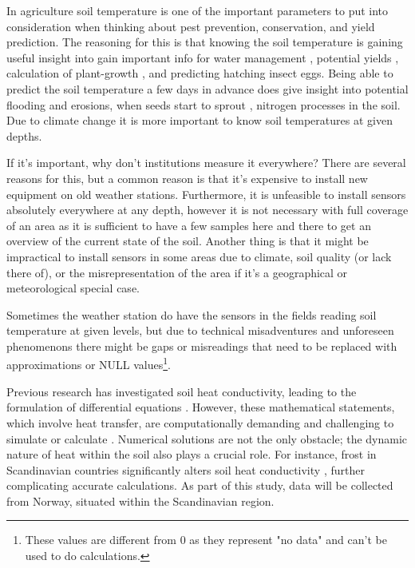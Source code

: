 In agriculture soil temperature is one of the important parameters to put into consideration when thinking about pest prevention, conservation, and yield prediction. The reasoning for this is that knowing the soil temperature is gaining useful insight into
gain important info for water management \cite{alizamir_advanced_2020},
potential yields \cite{sim_prediction_2020},
calculation of plant-growth \cite{li_modeling_2020},
and predicting hatching insect eggs\cite{nanushi_pest_2022,johnson_effects_2010}.
Being able to predict the soil temperature a few days in advance does give insight into
potential flooding and erosions\cite{stuurop_influence_2022},
when seeds start to sprout \cite{li_modeling_2020},
nitrogen processes \cite{rankinen_simple_2004} in the soil.
Due to climate change it is more important to know soil temperatures at given depths.

If it's important, why don't institutions measure it everywhere? There are several reasons for this, but a common reason is that it's expensive to install new equipment on old weather stations. Furthermore, it is unfeasible to install sensors absolutely everywhere at any depth, however it is not necessary with full coverage of an area as it is sufficient to have a few samples here and there to get an overview of the current state of the soil. Another thing is that it might be impractical to install sensors in some areas due to climate, soil quality (or lack there of), or the misrepresentation of the area if it's a geographical or meteorological special case.

Sometimes the weather station do have the sensors in the fields reading soil temperature at given levels, but due to technical misadventures and unforeseen phenomenons there might be gaps or misreadings that need to be replaced with approximations or NULL values\footnote{These values are different from 0 as they represent "no data" and can't be used to do calculations.}.

Previous research has investigated soil heat conductivity, leading to the formulation of differential equations \cite{karvonen_model_1988}. However, these mathematical statements, which involve heat transfer, are computationally demanding and challenging to simulate or calculate \cite{fourier_analytical_2009, karvonen_model_1988}. Numerical solutions are not the only obstacle; the dynamic nature of heat within the soil also plays a crucial role. For instance, frost in Scandinavian countries significantly alters soil heat conductivity \cite{stuurop_influence_2022}, further complicating accurate calculations. As part of this study, data will be collected from Norway, situated within the Scandinavian region.

